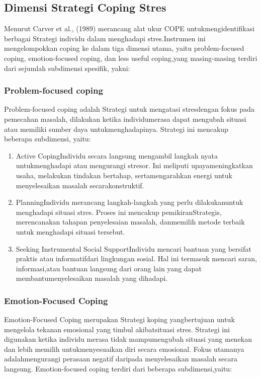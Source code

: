 \documentclass[../manperil.tex]{subfiles}
\begin{document}
\subsection{Dimensi Strategi Coping Stres}%
\label{sub:Dimensi Strategi Coping Stres}

Menurut Carver et al., (1989) merancang alat ukur COPE untukmengidentifikasi berbagai Strategi individu dalam menghadapi stres.Instrumen ini mengelompokkan coping ke dalam tiga dimensi utama, yaitu problem-focused coping, emotion-focused coping, dan less useful coping,yang masing-masing terdiri dari sejumlah subdimensi spesifik, yakni:

\subsubsection{Problem-focused coping}%
\label{ssub:problem-focused_coping}

Problem-focused coping adalah Strategi untuk mengatasi stresdengan fokus pada pemecahan masalah, dilakukan ketika individumerasa dapat mengubah situasi atau memiliki sumber daya untukmenghadapinya. Strategi ini mencakup beberapa subdimensi, yaitu:

\begin{enumerate}
	\item Active CopingIndividu secara langsung mengambil langkah nyata untukmenghadapi atau mengurangi stresor. Ini meliputi upayameningkatkan usaha, melakukan tindakan bertahap, sertamengarahkan energi untuk menyelesaikan masalah secarakonstruktif.
	\item PlanningIndividu merancang langkah-langkah yang perlu dilakukanuntuk menghadapi situasi stres. Proses ini mencakup pemikiranStrategis, merencanakan tahapan penyelesaian masalah, danmemilih metode terbaik untuk menghadapi situasi tersebut.
	\item Seeking Instrumental Social SupportIndividu mencari bantuan yang bersifat praktis atau informatifdari lingkungan sosial. Hal ini termasuk mencari saran, informasi,atau bantuan langsung dari orang lain yang dapat membantumenyelesaikan masalah yang dihadapi.
\end{enumerate}

\subsubsection{Emotion-Focused Coping}%
\label{ssub:emotion-focused_coping}

Emotion-Focused Coping merupakan Strategi koping yangbertujuan untuk mengelola tekanan emosional yang timbul akibatsituasi stres. Strategi ini digunakan ketika individu merasa tidak mampumengubah situasi yang menekan dan lebih memilih untukmenyesuaikan diri secara emosional. Fokus utamanya adalahmengurangi perasaan negatif daripada menyelesaikan masalah secara langsung. Emotion-focused coping terdiri dari beberapa subdimensi,yaitu:
\end{document}
